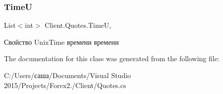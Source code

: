 \subsubsection{\texorpdfstring{TimeU}{TimeU}}
{\footnotesize\ttfamily List$<$int$>$ Client.\+Quotes.\+TimeU\hspace{0.3cm}{\ttfamily [get]}, {\ttfamily [set]}}



Свойство Unix\+Time времени времени 



The documentation for this class was generated from the following file\+:\begin{DoxyCompactItemize}
\item 
C\+:/\+Users/саша/\+Documents/\+Visual Studio 2015/\+Projects/\+Forex2./\+Client/Quotes.\+cs\end{DoxyCompactItemize}
